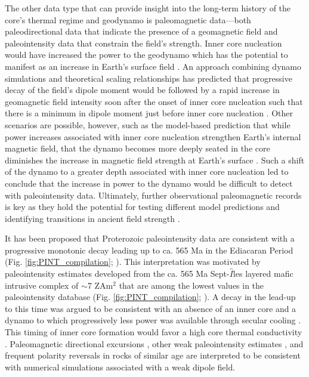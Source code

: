\documentclass[9pt,twocolumn,twoside,lineno]{pnas-new}
\begin{document}
The other data type that can provide insight into the long-term history of the core's thermal regime and geodynamo is paleomagnetic data---both paleodirectional data that indicate the presence of a geomagnetic field and paleointensity data that constrain the field's strength. Inner core nucleation would have increased the power to the geodynamo which has the potential to manifest as an increase in Earth's surface field \cite{Davies2021a}. An approach combining dynamo simulations and theoretical scaling relationships has predicted that progressive decay of the field's dipole moment would be followed by a rapid increase in geomagnetic field intensity soon after the onset of inner core nucleation such that there is a minimum in dipole moment just before inner core nucleation \cite{Davies2021a}. Other scenarios are possible, however, such as the model-based prediction that while power increases associated with inner core nucleation strengthen Earth's internal magnetic field, that the dynamo becomes more deeply seated in the core diminishes the increase in magnetic field strength at Earth's surface \cite{Aubert2009a, Landeau2017a}. Such a shift of the dynamo to a greater depth associated with inner core nucleation led \cite{Aubert2009a} to conclude that the increase in power to the dynamo would be difficult to detect with paleointensity data. Ultimately, further observational paleomagnetic records is key as they hold the potential for testing different model predictions and identifying transitions in ancient field strength \cite{Biggin2015a, Bono2019a}.

It has been proposed that Proterozoic paleointensity data are consistent with a progressive monotonic decay leading up to ca. 565 Ma in the Ediacaran Period (Fig. \ref{fig:PINT_compilation}; \citealp{Bono2019a}). This interpretation was motivated by paleointensity estimates developed from the ca. 565 Ma Sept-$\hat{I}$les layered mafic intrusive complex of $\sim$7 ZAm$^2$ that are among the lowest values in the paleointensity database (Fig. \ref{fig:PINT_compilation}; \citealp{Bono2019a}). A decay in the lead-up to this time was argued to be consistent with an absence of an inner core and a dynamo to which progressively less power was available through secular cooling \cite{Bono2019a, Davies2021a}. This timing of inner core formation would favor a high core thermal conductivity \cite[e.g.][]{Ohta2016a}. Paleomagnetic directional excursions \cite{Halls2015a}, other weak paleointensity estimates \cite{Thallner2021b}, and frequent polarity reversals \cite{Kodama2021a} in rocks of similar age are interpreted to be consistent with numerical simulations \cite{Driscoll2016a} associated with a weak dipole field. 
\end{document}
